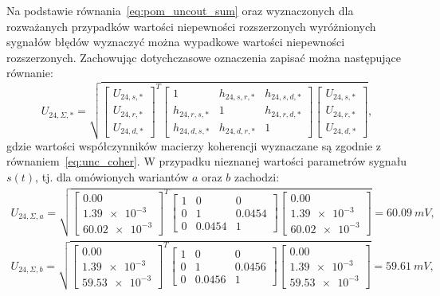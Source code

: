 Na podstawie równania~\eqref{eq:pom_uncout_sum} oraz wyznaczonych dla rozważanych przypadków wartości niepewności rozszerzonych wyróżnionych sygnałów błędów wyznaczyć można wypadkowe wartości niepewności rozszerzonych. Zachowując dotychczasowe oznaczenia zapisać można następujące równanie:
\begin{equation}
U_{24,\Sigma,*} = \sqrt{
\begin{bmatrix}
U_{24,s,*} \\ U_{24,r,*} \\ U_{24,d,*}
\end{bmatrix}^{T}
\begin{bmatrix}
1            & h_{24,s,r,*} & h_{24,s,d,*} \\
h_{24,r,s,*} &            1 & h_{24,r,d,*} \\
h_{24,d,s,*} & h_{24,d,r,*} &            1
\end{bmatrix}
\begin{bmatrix}
U_{24,s,*} \\ U_{24,r,*} \\ U_{24,d,*}
\end{bmatrix}}
\label{eq:pom_mono_all_unc_opt},
\end{equation}
gdzie wartości współczynników macierzy koherencji wyznaczane są zgodnie z równaniem~\eqref{eq:unc_coher}. W przypadku nieznanej wartości parametrów sygnału $s(t)$, tj. dla omówionych wariantów $a$ oraz $b$ zachodzi:
\begin{gather}
U_{24,\Sigma,a} = \sqrt{
\begin{bmatrix}
\num{0.00} \\ \num{1.39e-3} \\ \num{60.02e-3}
\end{bmatrix}^{T}
\begin{bmatrix}
\num{1} & \num{0} & \num{0} \\
\num{0} & \num{1} & \num{0.0454} \\
\num{0} & \num{0.0454} & \num{1}
\end{bmatrix}
\begin{bmatrix}
\num{0.00} \\ \num{1.39e-3} \\ \num{60.02e-3}
\end{bmatrix}} = \qty{60.09}{mV}
\label{eq:pom_mono_all_unc_a}, \\
U_{24,\Sigma,b} =  \sqrt{
\begin{bmatrix}
\num{0.00} \\ \num{1.39e-3} \\ \num{59.53e-3}
\end{bmatrix}^{T}
\begin{bmatrix}
\num{1} & \num{0} & \num{0} \\
\num{0} & \num{1} & \num{0.0456} \\
\num{0} & \num{0.0456} & \num{1}
\end{bmatrix}
\begin{bmatrix}
\num{0.00} \\ \num{1.39e-3} \\ \num{59.53e-3}
\end{bmatrix}} = \qty{59.61}{mV}
\label{eq:pom_mono_all_unc_b},
\end{gather}

